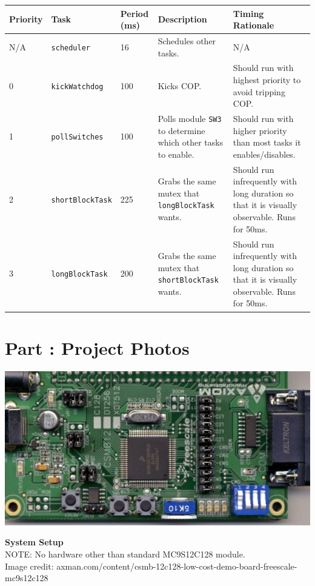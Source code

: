 \documentclass{article}
\newcounter{partNum}
\newcommand{\partNum}{%
        \stepcounter{partNum}%
        \thepartNum}
\newcommand{\sectPart}[1]{\section*{Part \partNum: #1}}
\begin{document}
\begin{center}
    \begin{tabular}{|l|l|l|p{10em}|p{10em}|}
        \hline
        \textbf{Priority} & \textbf{Task} & \textbf{Period (ms)} & \textbf{Description} & \textbf{Timing Rationale} \\ \hline
        N/A & \texttt{scheduler} & 16 & Schedules other tasks. & N/A \\ \hline
        0 & \texttt{kickWatchdog} & 100 & Kicks COP. & Should run with highest priority to avoid tripping COP. \\ \hline
        1 & \texttt{pollSwitches} & 100 & Polls module \texttt{SW3} to determine which other tasks to enable. & Should run with higher priority than most tasks it enables/disables. \\ \hline
        2 & \texttt{shortBlockTask} & 225 & Grabs the same mutex that \texttt{longBlockTask} wants. & Should run infrequently with long duration so that it is visually observable. Runs for 50ms. \\ \hline
        3 & \texttt{longBlockTask} & 200 & Grabs the same mutex that \texttt{shortBlockTask} wants. & Should run infrequently with long duration so that it is visually observable. Runs for 50ms. \\ \hline
    \end{tabular}
\end{center}


\sectPart{Project Photos}

    \begin{center}
        \includegraphics[scale=0.5]{system_setup.png}

        \textbf{System Setup} \\
        NOTE: No hardware other than standard MC9S12C128 module. \\
        Image credit: axman.com/content/csmb-12c128-low-cost-demo-board-freescale-mc9s12c128
    \end{center}
\end{document}
